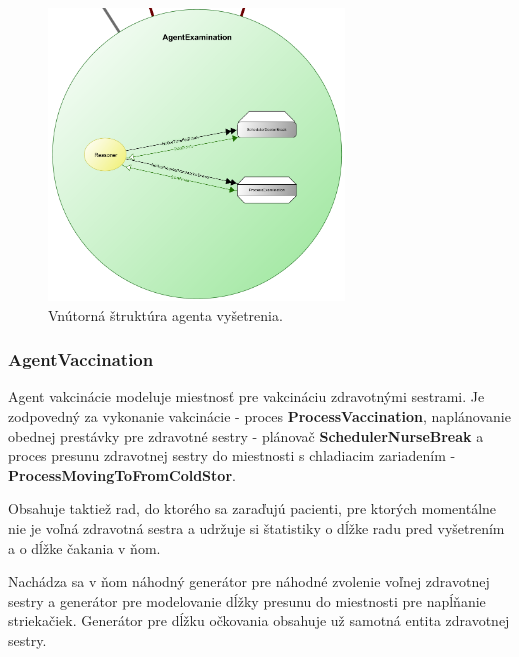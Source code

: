 \documentclass[letterpaper]{article}
\begin{document}
	\begin{figure}[hbt!]
		\centering
		\includegraphics[width=0.7\textwidth]{src/AgentExamination}
		\caption{Vnútorná štruktúra agenta vyšetrenia.}
	\end{figure}
	
	\newpage
	
	\subsubsection{AgentVaccination}
	
	Agent vakcinácie modeluje miestnosť pre vakcináciu zdravotnými sestrami. Je zodpovedný za vykonanie vakcinácie  - proces \textbf{ProcessVaccination}, naplánovanie obednej prestávky pre zdravotné sestry - plánovač \textbf{SchedulerNurseBreak} a proces presunu zdravotnej sestry do miestnosti s chladiacim zariadením - \textbf{ProcessMovingToFromColdStor}.
	
	Obsahuje taktiež rad, do ktorého sa zaraďujú pacienti, pre ktorých momentálne nie je voľná zdravotná sestra a udržuje si štatistiky o dĺžke radu pred vyšetrením a o dĺžke čakania v ňom.
	
	Nachádza sa v ňom náhodný generátor pre náhodné zvolenie voľnej zdravotnej sestry a generátor pre modelovanie dĺžky presunu do miestnosti pre napĺňanie striekačiek. Generátor pre dĺžku očkovania obsahuje už samotná entita zdravotnej sestry.
	
	\vspace{0.8cm}
	
\end{document}
